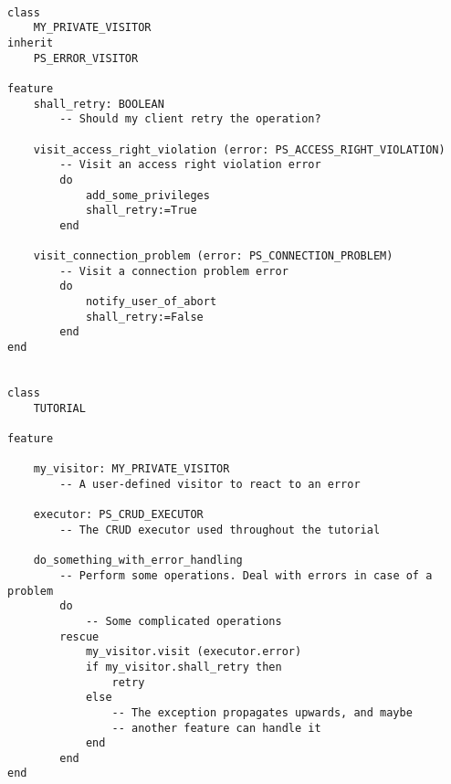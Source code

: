 \begin{lstlisting}[language=OOSC2Eiffel, captionpos=b, caption={}, label={lst:error_visitor_example}]

class
	MY_PRIVATE_VISITOR
inherit
	PS_ERROR_VISITOR

feature
	shall_retry: BOOLEAN
		-- Should my client retry the operation?

	visit_access_right_violation (error: PS_ACCESS_RIGHT_VIOLATION)
		-- Visit an access right violation error
		do
			add_some_privileges
			shall_retry:=True
		end

	visit_connection_problem (error: PS_CONNECTION_PROBLEM)
		-- Visit a connection problem error
		do
			notify_user_of_abort
			shall_retry:=False
		end
end


class
	TUTORIAL

feature

	my_visitor: MY_PRIVATE_VISITOR
		-- A user-defined visitor to react to an error

	executor: PS_CRUD_EXECUTOR
		-- The CRUD executor used throughout the tutorial

	do_something_with_error_handling
		-- Perform some operations. Deal with errors in case of a problem
		do
			-- Some complicated operations
		rescue
			my_visitor.visit (executor.error)
			if my_visitor.shall_retry then
				retry
			else
				-- The exception propagates upwards, and maybe
				-- another feature can handle it
			end
		end
end

\end{lstlisting}



